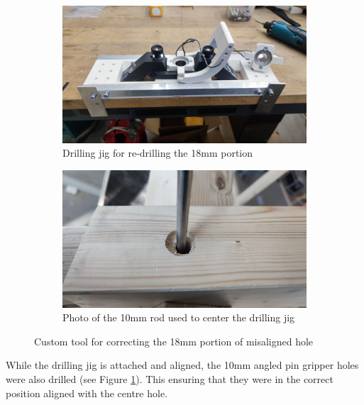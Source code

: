 \begin{figure}[!h]
    \centering
    \begin{subfigure}[b]{0.49\textwidth}
        \centering
        \includegraphics[width=\textwidth]{images/7b/img76.jpg}
        \caption{Drilling jig for re-drilling the 18mm portion}
    \end{subfigure}
    \hfill
    \begin{subfigure}[b]{0.49\textwidth}
        \centering
        \includegraphics[width=\textwidth]{images/7b/img77.jpg}
        \caption{Photo of the 10mm rod used to center the drilling jig}
    \end{subfigure}
    \caption{Custom tool for correcting the 18mm portion of misaligned hole}
    \label{fig:custom-made-tool-correct-18mm-hole}
\end{figure}

While the drilling jig is attached and aligned, the 10mm angled pin gripper holes were also drilled (see Figure \ref{fig:custom-made-tool-correct-18mm-hole}). This ensuring that they were in the correct position aligned with the centre hole. 

